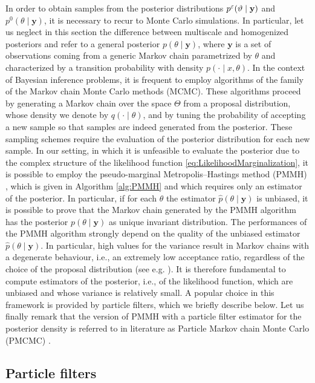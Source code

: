\documentclass[10pt]{article}
\begin{document}
In order to obtain samples from the posterior distributions $p^\varepsilon(\vartheta \mid \mathbf y)$ and $p^0(\theta \mid \mathbf y)$, it is necessary to recur to Monte Carlo simulations. In particular, let us neglect in this section the difference between multiscale and homogenized posteriors and refer to a general posterior $p(\theta \mid \mathbf y)$, where $\mathbf y$ is a set of observations coming from a generic Markov chain parametrized by $\theta$ and characterized by a transition probability with density $p(\cdot \mid x, \theta)$. In the context of Bayesian inference problems, it is frequent to employ algorithms of the family of the Markov chain Monte Carlo methods (MCMC). These algorithms proceed by generating a Markov chain over the space $\Theta$ from a proposal distribution, whose density we denote by $q(\cdot \mid \theta)$, and by tuning the probability of accepting a new sample so that samples are indeed generated from the posterior. These sampling schemes require the evaluation of the posterior distribution for each new sample. In our setting, in which it is unfeasible to evaluate the posterior due to the complex structure of the likelihood function \eqref{eq:LikelihoodMarginalization}, it is possible to employ the pseudo-marginal Metropolis--Hastings method (PMMH) \cite{AnR09}, which is given in Algorithm \ref{alg:PMMH} and which requires only an estimator of the posterior. In particular, if for each $\theta$ the estimator $\hat p(\theta \mid \mathbf y)$ is unbiased, it is possible to prove \cite{AnR09} that the Markov chain generated by the PMMH algorithm has the posterior $p(\theta \mid \mathbf y)$ as unique invariant distribution. The performances of the PMMH algorithm strongly depend on the quality of the unbiased estimator $\hat p(\theta \mid \mathbf y)$. In particular, high values for the variance result in Markov chains with a degenerate behaviour, i.e., an extremely low acceptance ratio, regardless of the choice of the proposal distribution (see e.g. \cite{DPD15}). It is therefore fundamental to compute estimators of the posterior, i.e., of the likelihood function, which are unbiased and whose variance is relatively small. A popular choice in this framework is provided by particle filters, which we briefly describe below. Let us finally remark that the version of PMMH with a particle filter estimator for the posterior density is referred to in literature as Particle Markov chain Monte Carlo (PMCMC) \cite{ADH10}.

\subsection{Particle filters}\label{sec:ParFil}
\end{document}
